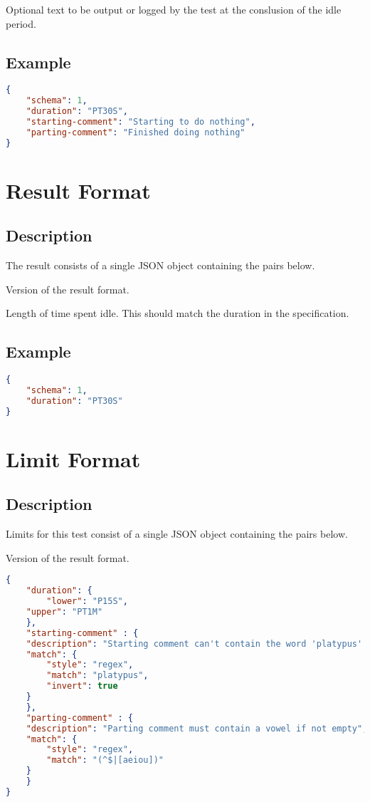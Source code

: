 \documentclass[10pt]{article}
\begin{document}
 Optional text to be output or
logged by the test at the conslusion of the idle period.

\subsection{Example}
\begin{lstlisting}[language=json]
{
    "schema": 1,
    "duration": "PT30S",
    "starting-comment": "Starting to do nothing",
    "parting-comment": "Finished doing nothing"
}
\end{lstlisting}


%
%

\section{Result Format}

\subsection{Description}
The result consists of a single JSON object containing the pairs
below.  \seejson

 Version of the result format.

 Length of time spent idle.  This should
match the duration in the specification.


\subsection{Example}
\begin{lstlisting}[language=json]
{
    "schema": 1,
    "duration": "PT30S"
}
\end{lstlisting}



%
%

\section{Limit Format}

\subsection{Description}
Limits for this test consist of a single JSON object containing the
pairs below.  \seejson

 Version of the result format.


\example
\begin{lstlisting}[language=json]
{
    "duration": {
        "lower": "P15S",
	"upper": "PT1M"
    },
    "starting-comment" : {
	"description": "Starting comment can't contain the word 'platypus'.",
	"match": {
	    "style": "regex",
	    "match": "platypus",
	    "invert": true
	}
    },
    "parting-comment" : {
	"description": "Parting comment must contain a vowel if not empty", 
	"match": {
	    "style": "regex",
	    "match": "(^$|[aeiou])"
	}
    }
}

\end{lstlisting}
\end{document}
